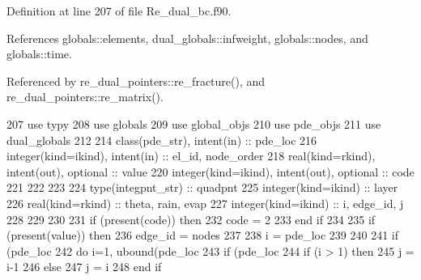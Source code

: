 Definition at line 207 of file Re\+\_\+dual\+\_\+bc.\+f90.



References globals\+::elements, dual\+\_\+globals\+::infweight, globals\+::nodes, and globals\+::time.



Referenced by re\+\_\+dual\+\_\+pointers\+::re\+\_\+fracture(), and re\+\_\+dual\+\_\+pointers\+::re\+\_\+matrix().


\begin{DoxyCode}
207       \textcolor{keywordtype}{use }typy
208       \textcolor{keywordtype}{use }globals
209       \textcolor{keywordtype}{use }global_objs
210       \textcolor{keywordtype}{use }pde_objs
211       \textcolor{keywordtype}{use }dual_globals
212 
214       \textcolor{keywordtype}{class}(pde_str), \textcolor{keywordtype}{intent(in)} :: pde\_loc 
216       \textcolor{keywordtype}{integer(kind=ikind)}, \textcolor{keywordtype}{intent(in)}  :: el\_id, node\_order
218       \textcolor{keywordtype}{real(kind=rkind)}, \textcolor{keywordtype}{intent(out)}, \textcolor{keywordtype}{optional}    :: value
220       \textcolor{keywordtype}{integer(kind=ikind)}, \textcolor{keywordtype}{intent(out)}, \textcolor{keywordtype}{optional} :: code
221       
222       
223       
224       \textcolor{keywordtype}{type}(integpnt_str) :: quadpnt
225       \textcolor{keywordtype}{integer(kind=ikind)} :: layer
226       \textcolor{keywordtype}{real(kind=rkind)} :: theta, rain, evap
227       \textcolor{keywordtype}{integer(kind=ikind)} :: i, edge\_id, j
228       
229       
230 
231       \textcolor{keywordflow}{if} (\textcolor{keyword}{present}(code)) \textcolor{keywordflow}{then}
232             code = 2
233 \textcolor{keywordflow}{      end if}
234       
235       \textcolor{keywordflow}{if} (\textcolor{keyword}{present}(\textcolor{keywordtype}{value})) \textcolor{keywordflow}{then}
236         edge\_id = nodes%
237 
238         i = pde\_loc%
239 
240 
241         \textcolor{keywordflow}{if} (pde\_loc%
242           \textcolor{keywordflow}{do} i=1, ubound(pde\_loc%
243             \textcolor{keywordflow}{if} (pde\_loc%
244               \textcolor{keywordflow}{if} (i > 1) \textcolor{keywordflow}{then}
245                 j = i-1
246               \textcolor{keywordflow}{else}
247                 j = i
248 \textcolor{keywordflow}{              end if}

\end{DoxyCode}
